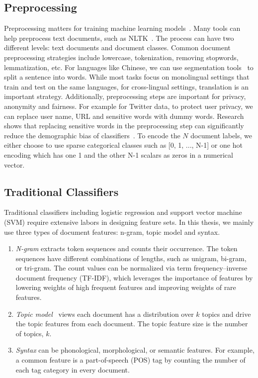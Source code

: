 \subsection{Preprocessing}
Preprocessing matters for training machine learning models~\cite{camacho2018role,huang2019matters}.
Many tools can help preprocess text documents, such as NLTK~\cite{bird2004nltk}.
The process can have two different levels: text documents and document classes.
Common document preprocessing strategies include lowercase, tokenization, removing stopwords, lemmatization, etc.
For languages like Chinese, we can use segmentation tools~\cite{sun2012jieba} to split a sentence into words.
While most tasks focus on monolingual settings that train and test on the same languages, for cross-lingual settings, translation is an important strategy.
Additionally, preprocessing steps are important for privacy, anonymity and fairness. 
For example for Twitter data, to protect user privacy, we can replace user name, URL and sensitive words with dummy words. 
Research shows that replacing sensitive words in the preprocessing step can significantly reduce the demographic bias of classifiers~\cite{dixon2018measuring}.
To encode the $N$ document labels, we either choose to use sparse categorical classes such as [0, 1, ..., N-1] or one hot encoding which has one 1 and the other N-1 scalars as zeros in a numerical vector. 


\subsection{Traditional Classifiers}

Traditional classifiers including logistic regression and support vector machine (SVM) require extensive labors in designing feature sets.
In this thesis, we mainly use three types of document features: n-gram, topic model and syntax.

\begin{enumerate}
\item \textit{N-gram} extracts token sequences and counts their occurrence. The token sequences have different combinations of lengths, such as unigram, bi-gram, or tri-gram. The count values can be normalized via term frequency–inverse document frequency (TF-IDF), which leverages the importance of features by lowering weights of high frequent features and improving weights of rare features.  
\item \textit{Topic model}~\cite{blei2003latent} views each document has a distribution over $k$ topics and drive the topic features from each document. The topic feature size is the number of topics, $k$. 
\item \textit{Syntax} can be phonological, morphological, or semantic features. For example, a common feature is a part-of-speech (POS) tag by counting the number of each tag category in every document. 
\end{enumerate}  


